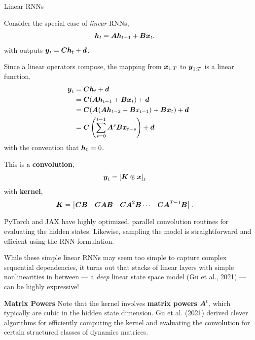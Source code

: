 \documentclass[aspectratio=169]{beamer}
\begin{document}
\begin{frame}[t,allowframebreaks]{Linear RNNs}\label{linear-rnns}

Consider the special case of \emph{linear} RNNs,
\begin{align*}
\boldsymbol{h}_t &= \boldsymbol{A} \boldsymbol{h}_{t-1} + \boldsymbol{B} \boldsymbol{x}_t.
\end{align*}
with outputs \(\boldsymbol{y}_t = \boldsymbol{C} \boldsymbol{h}_t + \boldsymbol{d}\).

Since a linear operators compose, the mapping from $\boldsymbol{x}_{1:T}$ to $\boldsymbol{y}_{1:T}$ is a linear function,
\begin{align*}
\boldsymbol{y}_t 
&= \boldsymbol{C} \boldsymbol{h}_t + \boldsymbol{d} \\
&= \boldsymbol{C} (\boldsymbol{A} \boldsymbol{h}_{t-1} + \boldsymbol{B} \boldsymbol{x}_t) + \boldsymbol{d} \\
&= \boldsymbol{C} (\boldsymbol{A} (\boldsymbol{A} \boldsymbol{h}_{t-2} + \boldsymbol{B} x_{t-1}) + \boldsymbol{B} \boldsymbol{x}_t) + \boldsymbol{d} \\
&= \boldsymbol{C} \left(\sum_{s=0}^{t-1} \boldsymbol{A}^s \boldsymbol{B} \boldsymbol{x}_{t-s} \right) + \boldsymbol{d} 
\end{align*} with the convention that \(\boldsymbol{h}_0 = 0\).

This is a \textbf{convolution},
\begin{align*}
\boldsymbol{y}_t &= \left[ \boldsymbol{K} \circledast \boldsymbol{x} \right]_t 
\end{align*}
with \textbf{kernel},
\begin{align*}
\boldsymbol{K} &= \begin{bmatrix}\boldsymbol{C} \boldsymbol{B}  & \boldsymbol{C} \boldsymbol{A} \boldsymbol{B} & \boldsymbol{C} \boldsymbol{A}^2 \boldsymbol{B} \cdots & \boldsymbol{C} \boldsymbol{A}^{T-1} \boldsymbol{B} \end{bmatrix}.
\end{align*}

PyTorch and JAX have highly optimized, parallel convolution routines for evaluating the hidden states. Likewise,
sampling the model is straightforward and efficient using the RNN
formulation.

While these simple linear RNNs may seem too simple to capture complex
sequential dependencies, it turns out that stacks of linear layers with
simple nonlinearities in between --- a \emph{deep} linear state space
model (Gu et al., 2021) --- can be highly expressive!

\textbf{Matrix Powers} Note that the kernel involves \textbf{matrix
powers} \(\boldsymbol{A}^t\), which typically are cubic in the hidden state
dimension. Gu et al. (2021) derived clever
algorithms for efficiently computing the kernel and evaluating the
convolution for certain structured classes of dynamics matrices.
\end{frame}
\end{document}
